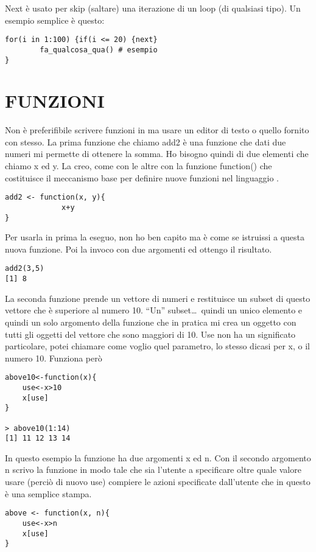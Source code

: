 Next è usato per skip (saltare) una iterazione di un loop (di qualsiasi tipo). Un esempio semplice è questo:

\begin{lstlisting}
for(i in 1:100) {if(i <= 20) {next}
		fa_qualcosa_qua() # esempio
}
\end{lstlisting}


\section{FUNZIONI}

Non è preferifibile scrivere funzioni in \erre ma usare un editor di testo o quello fornito con \erre stesso.	
La prima funzione che chiamo add2 è una funzione che dati due numeri mi permette di ottenere la somma. Ho bisogno quindi di due elementi che chiamo x ed y.  La creo, come con le altre con
la funzione function() che costituisce il meccanismo base per definire nuove funzioni
nel linguaggio \erre.
\begin{lstlisting}
add2 <- function(x, y){
		     x+y
}
\end{lstlisting}
Per usarla in \erre prima la eseguo, non ho ben capito ma è come se istruissi \erre
a questa nuova funzione.
Poi la invoco con due argomenti ed ottengo il risultato.
\begin{lstlisting}
add2(3,5)
[1] 8
\end{lstlisting}

La seconda funzione prende un vettore di numeri e restituisce un subset di questo vettore
che è superiore al numero 10. ``Un'' subset\dots\ quindi un unico elemento e quindi un solo argomento della funzione che in pratica mi crea un oggetto con tutti gli oggetti del  vettore che sono maggiori di 10. Use non ha un significato particolare, potei chiamare
come voglio quel parametro, lo stesso dicasi per x, o il numero 10. Funziona però

\begin{lstlisting}
above10<-function(x){
	use<-x>10
	x[use]
}

> above10(1:14)
[1] 11 12 13 14
\end{lstlisting}

In questo esempio la funzione ha due argomenti x ed n. Con il secondo argomento n
scrivo la funzione in modo tale che sia l'utente a specificare oltre quale valore
usare (perciò di nuovo use) compiere le azioni specificate dall'utente che in questo è una semplice stampa.
\begin{lstlisting}
above <- function(x, n){
	use<-x>n
	x[use]
}
\end{lstlisting}

